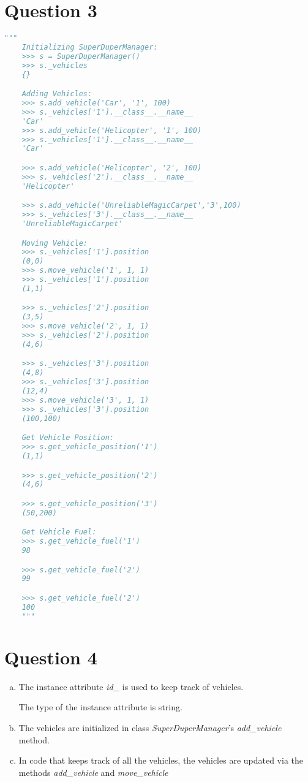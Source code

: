 \documentclass[12pt]{article}
\begin{document}
\section*{Question 3}
\begin{lstlisting}[language=Python]
    """
    Initializing SuperDuperManager:
    >>> s = SuperDuperManager()
    >>> s._vehicles
    {}

    Adding Vehicles:
    >>> s.add_vehicle('Car', '1', 100)
    >>> s._vehicles['1'].__class__.__name__
    'Car'
    >>> s.add_vehicle('Helicopter', '1', 100)
    >>> s._vehicles['1'].__class__.__name__
    'Car'

    >>> s.add_vehicle('Helicopter', '2', 100)
    >>> s._vehicles['2'].__class__.__name__
    'Helicopter'

    >>> s.add_vehicle('UnreliableMagicCarpet','3',100)
    >>> s._vehicles['3'].__class__.__name__
    'UnreliableMagicCarpet'

    Moving Vehicle:
    >>> s._vehicles['1'].position
    (0,0)
    >>> s.move_vehicle('1', 1, 1)
    >>> s._vehicles['1'].position
    (1,1)

    >>> s._vehicles['2'].position
    (3,5)
    >>> s.move_vehicle('2', 1, 1)
    >>> s._vehicles['2'].position
    (4,6)

    >>> s._vehicles['3'].position
    (4,8)
    >>> s._vehicles['3'].position
    (12,4)
    >>> s.move_vehicle('3', 1, 1)
    >>> s._vehicles['3'].position
    (100,100)

    Get Vehicle Position:
    >>> s.get_vehicle_position('1')
    (1,1)

    >>> s.get_vehicle_position('2')
    (4,6)

    >>> s.get_vehicle_position('3')
    (50,200)

    Get Vehicle Fuel:
    >>> s.get_vehicle_fuel('1')
    98

    >>> s.get_vehicle_fuel('2')
    99

    >>> s.get_vehicle_fuel('2')
    100
    """
\end{lstlisting}

\section*{Question 4}
\begin{enumerate}[a.]
    \item The instance attribute \textit{id\_} is used to keep track of vehicles.

    \bigskip

    The type of the instance attribute is string.

    \item The vehicles are initialized in class \textit{SuperDuperManager}'s
    \textit{add\_vehicle} method.

    \item In code that keeps track of all the vehicles, the vehicles are updated
    via the methods \textit{add\_vehicle} and \textit{move\_vehicle}
\end{enumerate}
\end{document}
